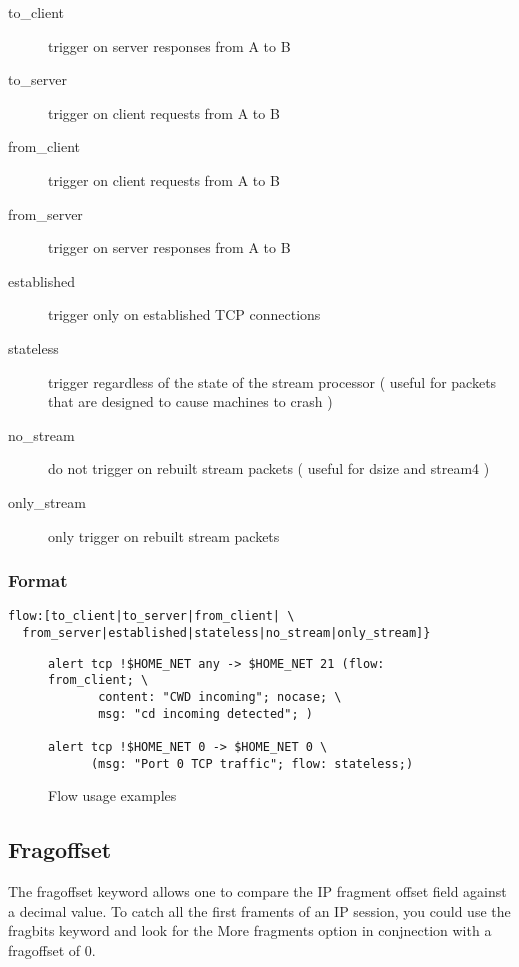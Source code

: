 \documentclass[english]{report}
\begin{document}
\begin{description}
\item [to\_client]trigger on server responses from A to B
\item [to\_server]trigger on client requests from A to B
\item [from\_client]trigger on client requests from A to B
\item [from\_server]trigger on server responses from A to B
\item [established]trigger only on established TCP connections
\item [stateless]trigger regardless of the state of the stream processor
( useful for packets that are designed to cause machines to crash
)
\item [no\_stream]do not trigger on rebuilt stream
packets ( useful for dsize and stream4 )
\item [only\_stream]only trigger on rebuilt stream
packets
\end{description}

\subsubsection{Format}

\begin{verbatim}
flow:[to_client|to_server|from_client| \
  from_server|established|stateless|no_stream|only_stream]}
\end{verbatim}
%
\begin{figure}[!hbpt]
\begin{verbatim}
alert tcp !$HOME_NET any -> $HOME_NET 21 (flow: from_client; \
       content: "CWD incoming"; nocase; \
       msg: "cd incoming detected"; )

alert tcp !$HOME_NET 0 -> $HOME_NET 0 \
      (msg: "Port 0 TCP traffic"; flow: stateless;)
\end{verbatim}

\caption{Flow usage examples\label{flow usage examples}}
\end{figure}



\subsection{Fragoffset \label{fragoffset section}}

The fragoffset keyword allows one to compare the IP fragment offset
field against a decimal value. To catch all the first framents of
an IP session, you could use the fragbits keyword and look for the
More fragments option in conjnection with a fragoffset of 0.
\end{document}
